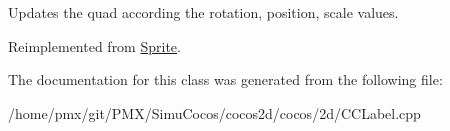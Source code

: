 Updates the quad according the rotation, position, scale values. 

Reimplemented from \hyperlink{classSprite_a6b64d23ba646325021c2a5118dc5163d}{Sprite}.



The documentation for this class was generated from the following file\+:\begin{DoxyCompactItemize}
\item 
/home/pmx/git/\+P\+M\+X/\+Simu\+Cocos/cocos2d/cocos/2d/C\+C\+Label.\+cpp\end{DoxyCompactItemize}
